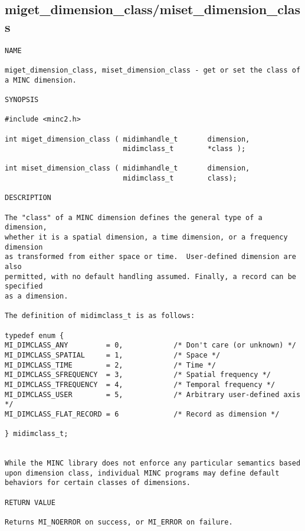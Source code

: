 \documentclass{article}
\begin{document}
\subsection{miget\_dimension\_class/miset\_dimension\_class}
\begin{verbatim}
NAME

miget_dimension_class, miset_dimension_class - get or set the class of
a MINC dimension.

SYNOPSIS

#include <minc2.h>

int miget_dimension_class ( midimhandle_t       dimension,
                            midimclass_t        *class );

int miset_dimension_class ( midimhandle_t       dimension,
                            midimclass_t        class);

DESCRIPTION

The "class" of a MINC dimension defines the general type of a dimension, 
whether it is a spatial dimension, a time dimension, or a frequency dimension
as transformed from either space or time.  User-defined dimension are also
permitted, with no default handling assumed. Finally, a record can be specified
as a dimension.

The definition of midimclass_t is as follows:

typedef enum { 
MI_DIMCLASS_ANY         = 0,            /* Don't care (or unknown) */
MI_DIMCLASS_SPATIAL     = 1,            /* Space */
MI_DIMCLASS_TIME        = 2,            /* Time */
MI_DIMCLASS_SFREQUENCY  = 3,            /* Spatial frequency */
MI_DIMCLASS_TFREQUENCY  = 4,            /* Temporal frequency */
MI_DIMCLASS_USER        = 5,            /* Arbitrary user-defined axis */
MI_DIMCLASS_FLAT_RECORD = 6             /* Record as dimension */

} midimclass_t;


While the MINC library does not enforce any particular semantics based
upon dimension class, individual MINC programs may define default
behaviors for certain classes of dimensions.

RETURN VALUE

Returns MI_NOERROR on success, or MI_ERROR on failure.
\end{verbatim}
\end{document}
